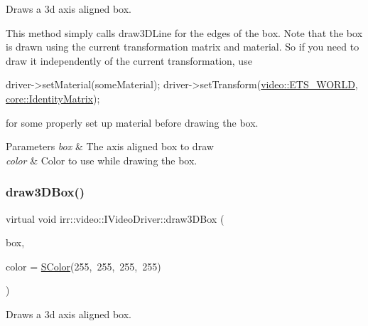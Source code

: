 Draws a 3d axis aligned box. 

This method simply calls draw3\+D\+Line for the edges of the box. Note that the box is drawn using the current transformation matrix and material. So if you need to draw it independently of the current transformation, use 
\begin{DoxyCode}
driver->setMaterial(someMaterial);
driver->setTransform(\hyperlink{namespaceirr_1_1video_a15b57657a320243be03ae6f66fcff43daf0d9765331daace35b8443c471738305}{video::ETS\_WORLD}, \hyperlink{namespaceirr_1_1core_ac4561f3920d3fbfbfff74c9bed1f2713}{core::IdentityMatrix});
\end{DoxyCode}
 for some properly set up material before drawing the box. 
\begin{DoxyParams}{Parameters}
{\em box} & The axis aligned box to draw \\
\hline
{\em color} & Color to use while drawing the box. \\
\hline
\end{DoxyParams}
\mbox{\label{classirr_1_1video_1_1IVideoDriver_a7773fce9358ee81db5484b2d21015570}} 
\subsubsection{\texorpdfstring{draw3\+D\+Box()}{draw3DBox()}\hspace{0.1cm}{\footnotesize\ttfamily [2/2]}}
{\footnotesize\ttfamily virtual void irr\+::video\+::\+I\+Video\+Driver\+::draw3\+D\+Box (\begin{DoxyParamCaption}\item[{const \hyperlink{classirr_1_1core_1_1aabbox3d}{core\+::aabbox3d}$<$ \hyperlink{namespaceirr_a0277be98d67dc26ff93b1a6a1d086b07}{f32} $>$ \&}]{box,  }\item[{\hyperlink{classirr_1_1video_1_1SColor}{S\+Color}}]{color = {\ttfamily \hyperlink{classirr_1_1video_1_1SColor}{S\+Color}(255,~255,~255,~255)} }\end{DoxyParamCaption})\hspace{0.3cm}{\ttfamily [pure virtual]}}



Draws a 3d axis aligned box. 

